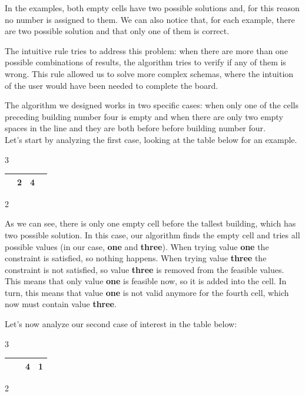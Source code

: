 \documentclass[12pt]{report}
\begin{document}
In the examples, both empty cells have two possible solutions and, for this
reason no number is assigned to them. We can also notice that, for each
example, there are two possible solution and that only one of them is
correct.

The intuitive rule tries to address this problem: when there are more than one
possible combinations of results, the algorithm tries to verify if any of them
is wrong. This rule allowed us to solve more complex schemas, where the intuition
of the user would have been needed to complete the board.

The algorithm we designed works in two specific cases: when only one of the
cells preceding building number four is empty and when there are only two
empty spaces in the line and they are both before before building number
four. \\

Let's start by analyzing the first case, looking at the table below for an
example.

\begin{center}
  3
  \begin{tabular}{| C{0.5cm} | C{0.5cm} | C{0.5cm} | C{0.5cm} |}
    \hline
    & 2 & 4 &  \tabularnewline \hline
  \end{tabular}
  2
\end{center}

As we can see, there is only one empty cell before the tallest building, which has
two possible solution. In this case, our algorithm finds the empty cell
and tries all possible values (in our case, \textbf{one} and
\textbf{three}). When trying value \textbf{one} the constraint is
satisfied, so nothing happens. When trying value \textbf{three} the
constraint is not satisfied, so value \textbf{three} is removed from the
feasible values. This means that only value \textbf{one} is feasible now,
so it is added into the cell. In turn, this means that value \textbf{one}
is not valid anymore for the fourth cell, which now must contain value
\textbf{three}.

\newpage

Let's now analyze our second case of interest in the table below:

\begin{center}
  3
  \begin{tabular}{| C{0.5cm} | C{0.5cm} | C{0.5cm} | C{0.5cm} |}
    \hline
    &  & 4 & 1 \tabularnewline \hline
  \end{tabular}
  2
\end{center}
\end{document}
